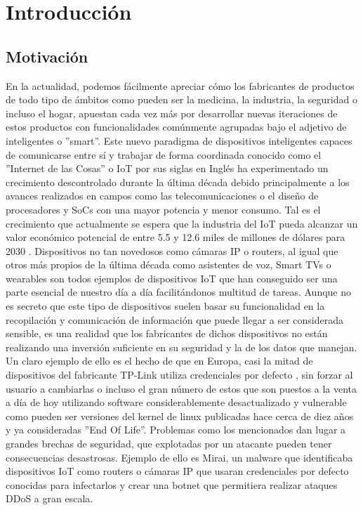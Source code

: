 \chapter{Introducción}

\section{Motivación}
En la actualidad, podemos fácilmente apreciar cómo los fabricantes de productos de todo tipo de
ámbitos como pueden ser la medicina, la industria, la seguridad o incluso el hogar, apuestan cada vez 
más por desarrollar nuevas iteraciones de estos productos con funcionalidades comúnmente agrupadas bajo el 
adjetivo de inteligentes o ''smart''. Este nuevo paradigma de dispositivos inteligentes capaces de 
comunicarse entre sí y trabajar de forma coordinada conocido como el ''Internet de las Cosas'' o IoT por 
sus siglas en Inglés ha experimentado un crecimiento descontrolado durante la última década debido 
principalmente a los avances realizados en campos como las telecomunicaciones o el diseño de procesadores y
SoCs con una mayor potencia y menor consumo. Tal es el crecimiento que actualmente se espera que la industria del
IoT pueda alcanzar un valor económico potencial de entre 5.5 y 12.6 miles de millones de dólares para
2030 \cite{McKinsey}.
\bigskip
Dispositivos no tan novedosos como cámaras IP o routers, al igual que otros más 
propios de la última década como asistentes de voz, Smart TVs o wearables son todos ejemplos 
de dispositivos IoT que han conseguido ser una parte esencial de nuestro día a día facilitándonos
multitud de tareas. Aunque no es secreto que este tipo de dispositivos suelen basar su funcionalidad en 
la recopilación y comunicación de información que puede llegar a ser considerada sensible, es una realidad 
que los fabricantes de dichos dispositivos no están realizando una inversión suficiente en su seguridad y 
la de los datos que manejan. Un claro ejemplo de ello es el hecho de que en Europa, casi la mitad 
de dispositivos del fabricante TP-Link utiliza credenciales por defecto \cite{Deepak}, sin forzar al usuario 
a cambiarlas o incluso el gran número de estos que son puestos a la venta a día de hoy utilizando software 
considerablemente desactualizado y vulnerable como pueden ser versiones del kernel de linux publicadas hace cerca de 
diez años y ya consideradas ''End Of Life''. Problemas como los mencionados dan lugar a grandes brechas de
seguridad, que explotadas por un atacante pueden tener consecuencias desastrosas. Ejemplo de ello es 
Mirai\cite{mirai}, un malware que identificaba dispositivos IoT como routers o cámaras IP que usaran credenciales 
por defecto conocidas para infectarlos y crear una botnet que permitiera realizar ataques DDoS a gran escala.\\

